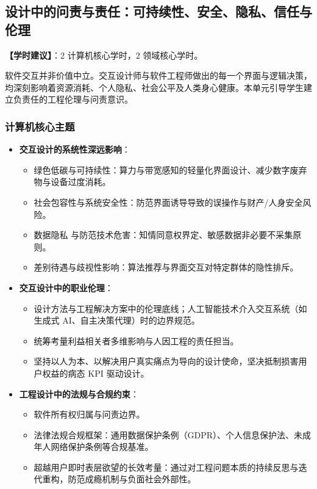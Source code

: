 \subsection{设计中的问责与责任：可持续性、安全、隐私、信任与伦理}
\textbf{【学时建议】}：2 计算机核心学时，2 领域核心学时。

软件交互并非价值中立。交互设计师与软件工程师做出的每一个界面与逻辑决策，均深刻影响着资源消耗、个人隐私、社会公平及人类身心健康。本单元引导学生建立负责任的工程伦理与问责意识。

\subsubsection{计算机核心主题}
\begin{itemize}
    \item \textbf{交互设计的系统性深远影响}：
    \begin{itemize}
        \item 绿色低碳与可持续性：算力与带宽感知的轻量化界面设计、减少数字废弃物与设备过度消耗。
        \item 社会包容性与系统安全性：防范界面诱导导致的误操作与财产/人身安全风险。
        \item 数据隐私 与防范技术危害：知情同意权界定、敏感数据非必要不采集原则。
        \item 差别待遇与歧视性影响：算法推荐与界面交互对特定群体的隐性排斥。
    \end{itemize}
    \item \textbf{交互设计中的职业伦理}：
    \begin{itemize}
        \item 设计方法与工程解决方案中的伦理底线；人工智能技术介入交互系统（如生成式 AI、自主决策代理）时的边界规范。
        \item 统筹考量利益相关者多维影响与人因工程的责任担当。
        \item 坚持以人为本、以解决用户真实痛点为导向的设计使命，坚决抵制损害用户权益的病态 KPI 驱动设计。
    \end{itemize}
    \item \textbf{工程设计中的法规与合规约束}：
    \begin{itemize}
        \item 软件所有权归属与问责边界。
        \item 法律法规合规框架：通用数据保护条例（GDPR）、个人信息保护法、未成年人网络保护条例等合规基准。
        \item 超越用户即时表层欲望的长效考量：通过对工程问题本质的持续反思与迭代重构，防范成瘾机制与负面社会外部性。
    \end{itemize}
\end{itemize}

